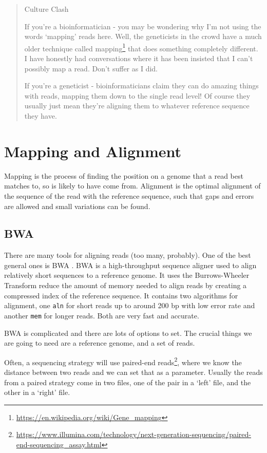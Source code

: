 \documentclass[12pt,]{book}
\let\rmarkdownfootnote\footnote%
\def\footnote{\protect\rmarkdownfootnote}
\renewcommand{\href}[2]{#2\footnote{\url{#1}}}
\begin{document}
\begin{quote}
Culture Clash

If you're a bioinformatician - you may be wondering why I'm not using
the words `mapping' reads here. Well, the geneticists in the crowd have
a much older technique called
\href{https://en.wikipedia.org/wiki/Gene_mapping}{mapping} that does
something completely different. I have honestly had conversations where
it has been insisted that I can't possibly map a read. Don't suffer as I
did.

If you're a geneticist - bioinformaticians claim they can do amazing
things with reads, mapping them down to the single read level! Of course
they usually just mean they're aligning them to whatever reference
sequence they have.
\end{quote}

\section{Mapping and Alignment}\label{mapping-and-alignment}

Mapping is the process of finding the position on a genome that a read
best matches to, so is likely to have come from. Alignment is the
optimal alignment of the sequence of the read with the reference
sequence, such that gaps and errors are allowed and small variations can
be found.

\subsection{BWA}\label{bwa}

There are many tools for aligning reads (too many, probably). One of the
best general ones is BWA \citep{Li:2010bl}. BWA is a high-throughput
sequence aligner used to align relatively short sequences to a reference
genome. It uses the Burrows-Wheeler Transform reduce the amount of
memory needed to align reads by creating a compressed index of the
reference sequence. It contains two algorithms for alignment, one
\texttt{aln} for short reads up to around 200 bp with low error rate and
another \texttt{mem} for longer reads. Both are very fast and accurate.

BWA is complicated and there are lots of options to set. The crucial
things we are going to need are a reference genome, and a set of reads.

Often, a sequencing strategy will use
\href{https://www.illumina.com/technology/next-generation-sequencing/paired-end-sequencing_assay.html}{paired-end
reads}, where we know the distance between two reads and we can set that
as a parameter. Usually the reads from a paired strategy come in two
files, one of the pair in a `left' file, and the other in a `right'
file.
\end{document}
